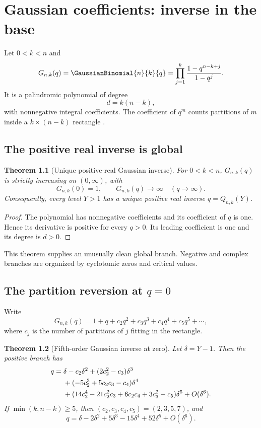 \documentclass[11pt,a4paper,oneside,openany]{book}
\newtheorem{theorem}{Theorem}[chapter]
\theoremstyle{definition}
\theoremstyle{remark}
\begin{document}
\chapter{Gaussian coefficients: inverse in the base}\label{chap:gaussian-inverse}

Let \(0<k<n\) and
\[
 G_{n,k}(q)=\GaussianBinomial{n}{k}{q}
 =\prod_{j=1}^{k}\frac{1-q^{n-k+j}}{1-q^j}.
\]
It is a palindromic polynomial of degree
\[
 d=k(n-k),
\]
with nonnegative integral coefficients.  The coefficient of \(q^m\) counts
partitions of \(m\) inside a \(k\times(n-k)\) rectangle
\cite{AndrewsPartitions,StanleyEC1}.

\section{The positive real inverse is global}

\begin{theorem}[Unique positive-real Gaussian inverse]\label{thm:qbin-positive-global}
For \(0<k<n\), \(G_{n,k}(q)\) is strictly increasing on \((0,\infty)\),
with
\[
 G_{n,k}(0)=1,
 \qquad
 G_{n,k}(q)\to\infty\quad(q\to\infty).
\]
Consequently, every level \(Y>1\) has a unique positive real inverse
\(q=Q_{n,k}(Y)\).
\end{theorem}

\begin{proof}
The polynomial has nonnegative coefficients and its coefficient of \(q\) is
one.  Hence its derivative is positive for every \(q>0\).  Its leading
coefficient is one and its degree is \(d>0\).
\end{proof}

This theorem supplies an unusually clean global branch.  Negative and
complex branches are organized by cyclotomic zeros and critical values.

\section{The partition reversion at \texorpdfstring{$q=0$}{q=0}}

Write
\[
 G_{n,k}(q)=1+q+c_2q^2+c_3q^3+c_4q^4+c_5q^5+\cdots,
\]
where \(c_j\) is the number of partitions of \(j\) fitting in the rectangle.

\begin{theorem}[Fifth-order Gaussian inverse at zero]\label{thm:qbin-qzero}
Let \(\delta=Y-1\).  Then the positive branch has
\begin{align}
 q={}&\delta-c_2\delta^2+(2c_2^2-c_3)\delta^3\notag\\
 &+(-5c_2^3+5c_2c_3-c_4)\delta^4\notag\\
 &+(14c_2^4-21c_2^2c_3+6c_2c_4+3c_3^2-c_5)\delta^5
 +O(\delta^6).
\label{eq:qbin-qzero-inverse}
\end{align}
If \(\min(k,n-k)\ge5\), then
\((c_2,c_3,c_4,c_5)=(2,3,5,7)\), and
\begin{equation}\label{eq:qbin-qzero-stable}
 q=\delta-2\delta^2+5\delta^3-15\delta^4+52\delta^5+O(\delta^6).
\end{equation}
\end{theorem}
\end{document}
